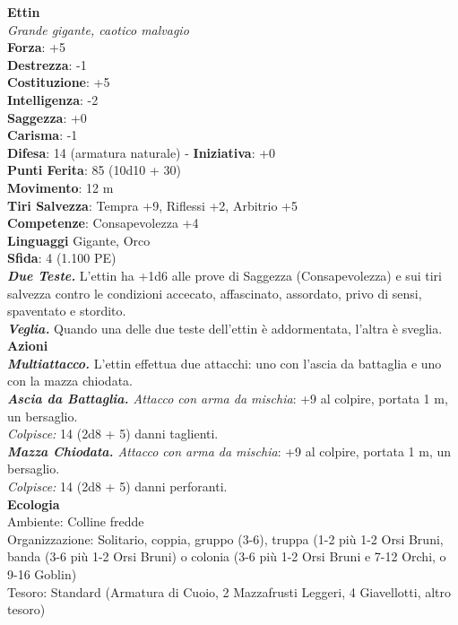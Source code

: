 \begin{multicols}{2}
\medskip\textbf{Ettin}\\
\emph{Grande gigante, caotico malvagio}\\
\textbf{Forza}: +5\\
\textbf{Destrezza}: -1\\
\textbf{Costituzione}: +5\\
\textbf{Intelligenza}: -2\\
\textbf{Saggezza}: +0\\
\textbf{Carisma}: -1\\
\textbf{Difesa}: 14 (armatura naturale) - \textbf{Iniziativa}: +0\\
\textbf{Punti Ferita}: 85 (10d10 + 30)\\
\textbf{Movimento}: 12 m\\
\textbf{Tiri Salvezza}: Tempra +9, Riflessi +2, Arbitrio +5\\
\textbf{Competenze}: Consapevolezza +4\\
\textbf{Linguaggi} Gigante, Orco\\
\textbf{Sfida}: 4 (1.100 PE)\smallskip\\
\emph{\textbf{Due Teste.}} L'ettin ha +1d6 alle prove di Saggezza (Consapevolezza) e sui tiri salvezza contro le condizioni accecato, affascinato, assordato, privo di sensi, spaventato e stordito. \\
\emph{\textbf{Veglia.}} Quando una delle due teste dell'ettin è addormentata, l'altra è sveglia.\\
\smallskip\textbf{Azioni} \\
\emph{\textbf{Multiattacco.}} L'ettin effettua due attacchi: uno con l'ascia da battaglia e uno con la mazza chiodata.\\
\emph{\textbf{Ascia da Battaglia.} Attacco con arma da mischia}: +9 al colpire, portata 1 m, un bersaglio.\\
\emph{Colpisce:} 14 (2d8 + 5) danni taglienti.\\
\emph{\textbf{Mazza Chiodata.} Attacco con arma da mischia}: +9 al colpire, portata 1 m, un bersaglio.\\
\emph{Colpisce:} 14 (2d8 + 5) danni perforanti.\\
\textbf{Ecologia}\\
Ambiente: Colline fredde\\
Organizzazione: Solitario, coppia, gruppo (3-6), truppa (1-2 più 1-2 Orsi Bruni, banda (3-6 più 1-2 Orsi Bruni) o colonia (3-6 più 1-2 Orsi Bruni e 7-12 Orchi, o 9-16 Goblin)\\
Tesoro: Standard (Armatura di Cuoio, 2 Mazzafrusti Leggeri, 4 Giavellotti, altro tesoro)\\

\end{multicols}
